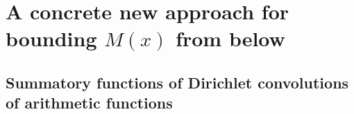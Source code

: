 \documentclass[11pt,reqno,a4letter]{article}
\numberwithin{figure}{section}
\numberwithin{table}{section}
\theoremstyle{plain}
\numberwithin{theorem}{section}
\theoremstyle{definition}
\begin{document}
%

\newpage 
\section{A concrete new approach for bounding $M(x)$ from below} 

\subsection{Summatory functions of Dirichlet convolutions of arithmetic functions} 
\end{document}
